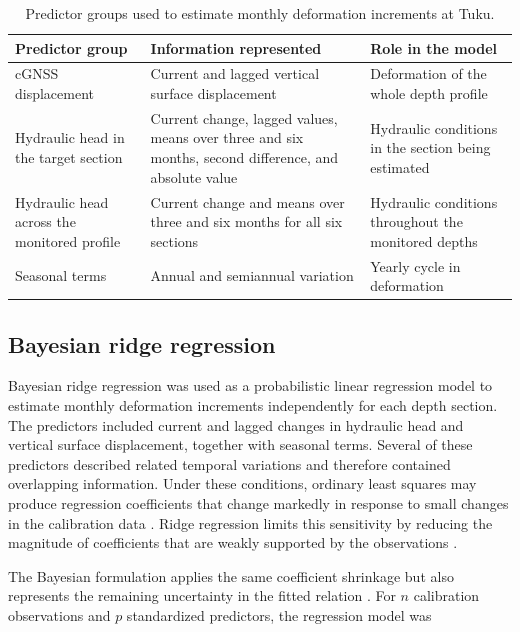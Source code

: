 \begin{table}[htbp]
  \centering
  \small
  \renewcommand{\arraystretch}{1.15}
  \caption{Predictor groups used to estimate monthly deformation increments at Tuku.}
  \label{tab:predictor_summary}
  \begin{tabularx}{\textwidth}{@{}p{}p{}X@{}}
    \toprule
    \textbf{Predictor group} & \textbf{Information represented} & \textbf{Role in the model} \\
    \midrule
    cGNSS displacement & Current and lagged vertical surface displacement & Deformation of the whole depth profile \\
    Hydraulic head in the target section & Current change, lagged values, means over three and six months, second difference, and absolute value & Hydraulic conditions in the section being estimated \\
    Hydraulic head across the monitored profile & Current change and means over three and six months for all six sections & Hydraulic conditions throughout the monitored depths \\
    Seasonal terms & Annual and semiannual variation & Yearly cycle in deformation \\
    \bottomrule
  \end{tabularx}
\end{table}

\subsection{Bayesian ridge regression}
\label{subsec:bayesian_ridge}

Bayesian ridge regression was used as a probabilistic linear regression model to estimate monthly deformation increments independently for each depth section. The predictors included current and lagged changes in hydraulic head and vertical surface displacement, together with seasonal terms. Several of these predictors described related temporal variations and therefore contained overlapping information. Under these conditions, ordinary least squares may produce regression coefficients that change markedly in response to small changes in the calibration data \citep{dormann_collinearity_2013, hastie_elements_2009}. Ridge regression limits this sensitivity by reducing the magnitude of coefficients that are weakly supported by the observations \citep{hoerl_1970_ridge, hastie_elements_2009}.

The Bayesian formulation applies the same coefficient shrinkage but also represents the remaining uncertainty in the fitted relation \citep{mackay_bayesian_1992, bishop_pattern_2006}. For $n$ calibration observations and $p$ standardized predictors, the regression model was

